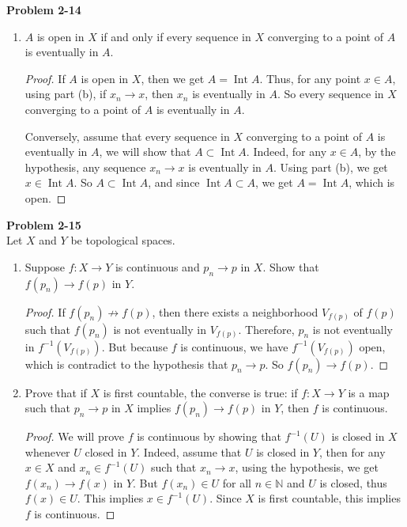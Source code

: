\documentclass[12pt, a4paper]{article}
\theoremstyle{plain}
\newcommand{\N}{\mathbb{N}}
\DeclareMathOperator{\inter}{Int}
\newenvironment{problem}[2][Problem]
    { \begin{mdframed}[backgroundcolor=gray!20] \textbf{#1 #2} \\}
    {  \end{mdframed}}
\begin{document}
\begin{problem}{2-14}
\begin{enumerate}[label=(\alph*)]
\begin{proof}
	Conversely, if $A$ contains every limit of every convergent sequence of points in $A$, then we will show that $\overline{A}\subset A$. Indeed, for any point $x\in \overline{A}$, by (a), there exists a convergent sequence $x_n\in A$ such that $x_n\rightarrow x$. But using the hypothesis, we get $x\in A$. So $\overline{A}\subset A$, and since $A\subset \overline{A}$, we get $A=\overline{A}$ is closed.
	\end{proof}

\item $A$ is open in $X$ if and only if every sequence in $X$ converging to a point of $A$ is eventually in $A$.
	\begin{proof}
	If $A$ is open in $X$, then we get $A=\inter{A}$.  Thus, for any point $x\in A$, using part (b), if $x_n\rightarrow x$, then $x_n$ is eventually in $A$. So every sequence in $X$ converging to a point of $A$ is eventually in $A$.
	
	Conversely, assume that every sequence in $X$ converging to a point of $A$ is eventually in $A$, we will show that $A\subset \inter{A}$. Indeed, for any $x\in A$, by the hypothesis, any sequence $x_n\rightarrow x$ is eventually in $A$. Using part (b), we get $x\in \inter{A}$. So $A\subset \inter{A}$, and since $\inter{A}\subset A$, we get $A=\inter{A}$, which is open.
	\end{proof}
\end{enumerate}
\end{problem}

\begin{problem}{2-15}
Let $X$ and $Y$ be topological spaces.
\begin{enumerate}
\item Suppose $f:X\rightarrow Y$ is continuous and $p_n\rightarrow p$ in $X$. Show that $f(p_n)\rightarrow f(p)$ in $Y$.
	\begin{proof}
	If $f(p_n)\not\rightarrow f(p)$, then there exists a neighborhood $V_{f(p)}$ of $f(p)$ such that $f(p_n)$ is not eventually in $V_{f(p)}$. Therefore, $p_n$ is not eventually in $f^{-1}(V_{f(p)})$. But because $f$ is continuous, we have $f^{-1}(V_{f(p)})$ open, which is contradict to the hypothesis that $p_n\rightarrow p$. So $f(p_n)\rightarrow f(p)$.
	\end{proof}

\item Prove that if $X$ is first countable, the converse is true: if $f:X\rightarrow Y$ is a map such that $p_n\rightarrow p$ in $X$ implies $f(p_n)\rightarrow f(p)$ in $Y$, then $f$ is continuous.
	\begin{proof}
	We will prove $f$ is continuous by showing that $f^{-1}(U)$ is closed in $X$ whenever $U$ closed in $Y$. Indeed, assume that $U$ is closed in $Y$, then for any $x\in X$ and $x_n\in f^{-1}(U)$ such that $x_n\rightarrow x$, using the hypothesis, we get $f(x_n)\rightarrow f(x)$ in $Y$. But $f(x_n)\in U$ for all $n\in\N$ and $U$ is closed, thus $f(x)\in U$. This implies $x\in f^{-1}(U)$. Since $X$ is first countable, this implies $f$ is continuous.
	\end{proof}
\end{enumerate}
\end{problem}
\end{document}
